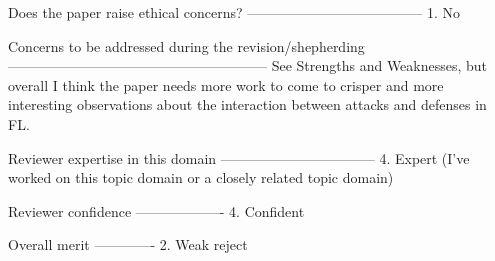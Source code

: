 Does the paper raise ethical concerns?
--------------------------------------
1. No

Concerns to be addressed during the revision/shepherding
--------------------------------------------------------
See Strengths and Weaknesses, but overall I think the paper needs more work to come to crisper and more interesting observations about the interaction between attacks and defenses in FL.

Reviewer expertise in this domain
---------------------------------
4. Expert (I've worked on this topic domain or a closely related topic
 domain)

Reviewer confidence
-------------------
4. Confident

Overall merit
-------------
2. Weak reject